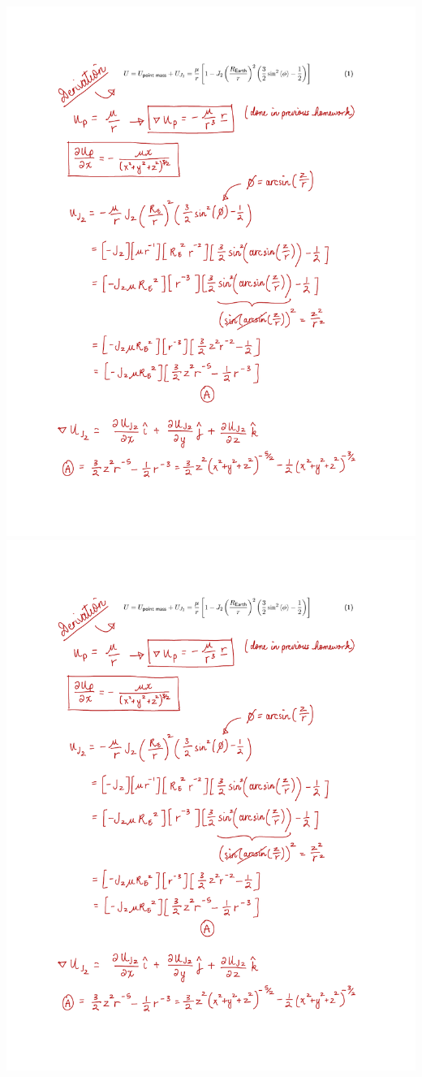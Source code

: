 \documentclass[conf]{new-aiaa}
\begin{document}
\includegraphics[page=2, width=\textwidth]{dUdx_derivation.pdf} \newpage
\includegraphics[page=3, width=\textwidth]{dUdx_derivation.pdf}
\end{document}
